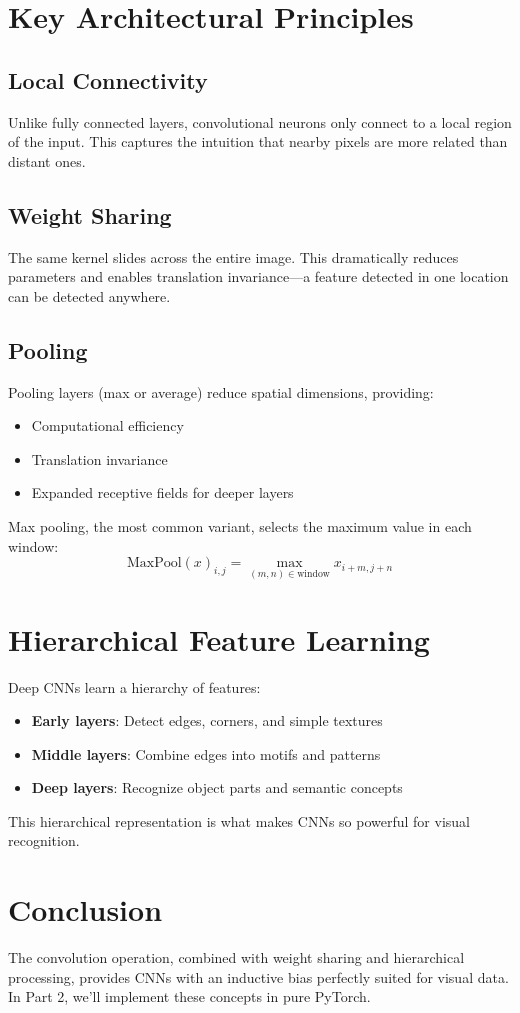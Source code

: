 \documentclass[12pt]{article}
\begin{document}
\section{Key Architectural Principles}

\subsection{Local Connectivity}
Unlike fully connected layers, convolutional neurons only connect to a local region of the input. This captures the intuition that nearby pixels are more related than distant ones.

\subsection{Weight Sharing}
The same kernel slides across the entire image. This dramatically reduces parameters and enables translation invariance---a feature detected in one location can be detected anywhere.

\subsection{Pooling}
Pooling layers (max or average) reduce spatial dimensions, providing:
\begin{itemize}
    \item Computational efficiency
    \item Translation invariance
    \item Expanded receptive fields for deeper layers
\end{itemize}

Max pooling, the most common variant, selects the maximum value in each window:
\begin{equation}
    \text{MaxPool}(x)_{i,j} = \max_{(m,n) \in \text{window}} x_{i+m, j+n}
\end{equation}

\section{Hierarchical Feature Learning}
Deep CNNs learn a hierarchy of features:
\begin{itemize}
    \item \textbf{Early layers}: Detect edges, corners, and simple textures
    \item \textbf{Middle layers}: Combine edges into motifs and patterns
    \item \textbf{Deep layers}: Recognize object parts and semantic concepts
\end{itemize}

This hierarchical representation is what makes CNNs so powerful for visual recognition.

\section{Conclusion}
The convolution operation, combined with weight sharing and hierarchical processing, provides CNNs with an inductive bias perfectly suited for visual data. In Part 2, we'll implement these concepts in pure PyTorch.
\end{document}
